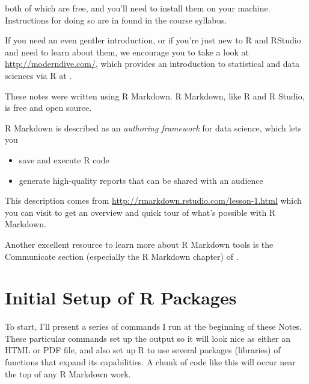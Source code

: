 \documentclass[
]{book}
\newenvironment{Shaded}{\begin{snugshade}}{\end{snugshade}}
\newcommand{\CommentTok}[1]{\textcolor[rgb]{0.56,0.35,0.01}{\textit{#1}}}
\newcommand{\DataTypeTok}[1]{\textcolor[rgb]{0.13,0.29,0.53}{#1}}
\newcommand{\KeywordTok}[1]{\textcolor[rgb]{0.13,0.29,0.53}{\textbf{#1}}}
\newcommand{\NormalTok}[1]{#1}
\newcommand{\OperatorTok}[1]{\textcolor[rgb]{0.81,0.36,0.00}{\textbf{#1}}}
\newcommand{\OtherTok}[1]{\textcolor[rgb]{0.56,0.35,0.01}{#1}}
\providecommand{\tightlist}{%
  \setlength{\itemsep}{0pt}\setlength{\parskip}{0pt}}
\begin{document}
both of which are free, and you'll need to install them on your machine. Instructions for doing so are in found in the course syllabus.

If you need an even gentler introduction, or if you're just new to R and RStudio and need to learn about them, we encourage you to take a look at \url{http://moderndive.com/}, which provides an introduction to statistical and data sciences via R at \citet{ModernDive}.

These notes were written using R Markdown. R Markdown, like R and R Studio, is free and open source.

R Markdown is described as an \emph{authoring framework} for data science, which lets you

\begin{itemize}
\tightlist
\item
  save and execute R code
\item
  generate high-quality reports that can be shared with an audience
\end{itemize}

This description comes from \url{http://rmarkdown.rstudio.com/lesson-1.html} which you can visit to get an overview and quick tour of what's possible with R Markdown.

Another excellent resource to learn more about R Markdown tools is the Communicate section (especially the R Markdown chapter) of \citet{R4DS}.

\hypertarget{initial-setup-of-r-packages}{%
\section*{Initial Setup of R Packages}\label{initial-setup-of-r-packages}}

To start, I'll present a series of commands I run at the beginning of these Notes. These particular commands set up the output so it will look nice as either an HTML or PDF file, and also set up R to use several packages (libraries) of functions that expand its capabilities. A chunk of code like this will occur near the top of any R Markdown work.

\begin{Shaded}
\end{Shaded}
\end{document}
